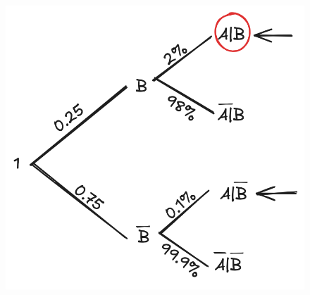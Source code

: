 \documentclass[twoside,final]{hcmut-report}
\begin{document}
\begin{minipage}{0.4\textwidth}
    \begin{figure}[H]
        \centering
        \includegraphics[width=\textwidth]{images/Nghệ An 2025 - Đợt 3/NgheAn25-1.png}
    \end{figure}
\end{minipage}
\end{document}
